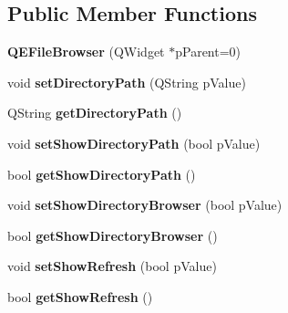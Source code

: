 \subsection*{Public Member Functions}
\begin{DoxyCompactItemize}
\item 
\hypertarget{classQEFileBrowser_a36b870f5e088c98ee607468a97189e82}{
{\bfseries QEFileBrowser} (QWidget $\ast$pParent=0)}
\label{classQEFileBrowser_a36b870f5e088c98ee607468a97189e82}

\item 
\hypertarget{classQEFileBrowser_a6d91b08e8f42679595a98fb7264898ae}{
void {\bfseries setDirectoryPath} (QString pValue)}
\label{classQEFileBrowser_a6d91b08e8f42679595a98fb7264898ae}

\item 
\hypertarget{classQEFileBrowser_abc18f30262d30cefb3e56a1f9800b211}{
QString {\bfseries getDirectoryPath} ()}
\label{classQEFileBrowser_abc18f30262d30cefb3e56a1f9800b211}

\item 
\hypertarget{classQEFileBrowser_a1ba7651c1a080d60db89c098c34b3e02}{
void {\bfseries setShowDirectoryPath} (bool pValue)}
\label{classQEFileBrowser_a1ba7651c1a080d60db89c098c34b3e02}

\item 
\hypertarget{classQEFileBrowser_a93f503aa3b9aab039b385a310ebdd192}{
bool {\bfseries getShowDirectoryPath} ()}
\label{classQEFileBrowser_a93f503aa3b9aab039b385a310ebdd192}

\item 
\hypertarget{classQEFileBrowser_a320915a744981c2d09aea4a721a896ed}{
void {\bfseries setShowDirectoryBrowser} (bool pValue)}
\label{classQEFileBrowser_a320915a744981c2d09aea4a721a896ed}

\item 
\hypertarget{classQEFileBrowser_aad870b241e474d1ec60de2992c733db5}{
bool {\bfseries getShowDirectoryBrowser} ()}
\label{classQEFileBrowser_aad870b241e474d1ec60de2992c733db5}

\item 
\hypertarget{classQEFileBrowser_a965ddf725722857dfc87da1af633369c}{
void {\bfseries setShowRefresh} (bool pValue)}
\label{classQEFileBrowser_a965ddf725722857dfc87da1af633369c}

\item 
\hypertarget{classQEFileBrowser_a26387d2d58bd0f52a18130b9aabe1338}{
bool {\bfseries getShowRefresh} ()}
\label{classQEFileBrowser_a26387d2d58bd0f52a18130b9aabe1338}


\end{DoxyCompactItemize}
